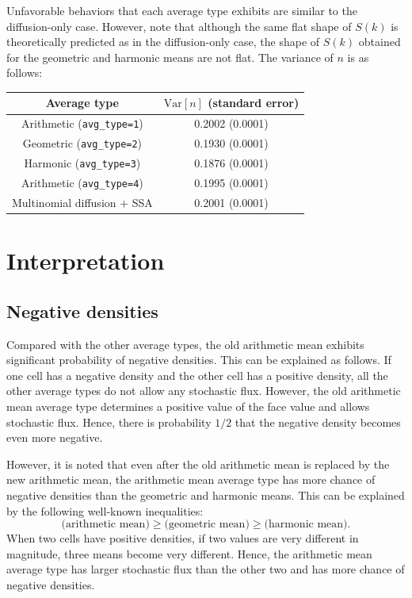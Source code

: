 \documentclass{article}
\begin{document}
Unfavorable behaviors that each average type exhibits are similar to the diffusion-only case.
However, note that although the same flat shape of $S(k)$ is theoretically predicted as in the diffusion-only case, the shape of $S(k)$ obtained for the geometric and harmonic means are not flat. 
The variance of $n$ is as follows:
\begin{center}
{\tabulinesep=1.2mm
\begin{tabu}{|c|c|}
\hline
Average type & $\mathrm{Var}[n]$ (standard error) \\
\hline
Arithmetic (\texttt{avg\_type=1}) & 0.2002 (0.0001) \\
\hline
Geometric (\texttt{avg\_type=2}) & 0.1930 (0.0001) \\
\hline
Harmonic (\texttt{avg\_type=3}) & 0.1876 (0.0001) \\
\hline
Arithmetic (\texttt{avg\_type=4}) & 0.1995 (0.0001) \\
\hline
Multinomial diffusion + SSA & 0.2001 (0.0001) \\
\hline
\end{tabu}
}
\end{center}

\section{Interpretation}

\subsection{Negative densities}

Compared with the other average types, the old arithmetic mean exhibits significant probability of negative densities.
This can be explained as follows.
If one cell has a negative density and the other cell has a positive density, all the other average types do not allow any stochastic flux.
However, the old arithmetic mean average type determines a positive value of the face value and allows stochastic flux.
Hence, there is probability $1/2$ that the negative density becomes even more negative.

However, it is noted that even after the old arithmetic mean is replaced by the new arithmetic mean, the arithmetic mean average type has more chance of negative densities than the geometric and harmonic means. This can be explained by the following well-known inequalities:
\begin{equation}
\label{inequil}
\mbox{(arithmetic mean)}\ge\mbox{(geometric mean)}\ge\mbox{(harmonic mean)}.
\end{equation}
When two cells have positive densities, if two values are very different in magnitude, three means become very different.
Hence, the arithmetic mean average type has larger stochastic flux than the other two and has more chance of negative densities.
\end{document}
